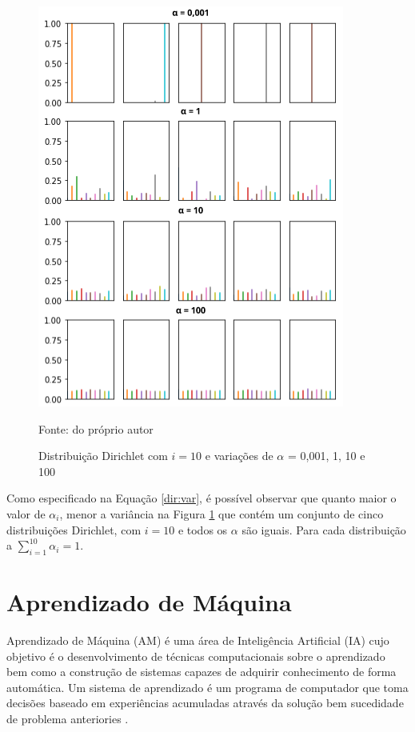 \begin{figure}[!h]
	\centering
	\includegraphics[keepaspectratio=true,scale=0.7]{figuras/dist-diri-var.png}
	\caption{Distribuição Dirichlet com $i=10$ e variações de $\alpha$ = 0,001, 1, 10 e 100 }
	Fonte: do próprio autor
	\label{fig09}
\end{figure}

Como especificado na Equação \ref{dir:var}, é possível observar que quanto maior o valor de $\alpha_i$, menor a variância na Figura \ref{fig09} que contém um conjunto de cinco distribuições Dirichlet, com $i=10$ e todos os $\alpha$ são iguais. Para cada distribuição a $\sum_{i=1}^{10} \alpha_i = 1$.


\section{Aprendizado de Máquina}

Aprendizado de Máquina (AM) é uma área de Inteligência Artificial (IA) cujo objetivo é o desenvolvimento de técnicas computacionais sobre o aprendizado bem como a construção de sistemas capazes de adquirir conhecimento de forma automática. Um sistema de aprendizado é um programa de computador que toma decisões baseado em experiências acumuladas através da solução bem sucedidade de problema anteriories \cite{monard2003}. 


